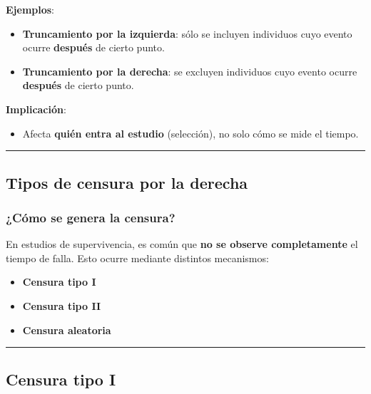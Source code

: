 \documentclass[
  letterpaper,
  DIV=11,
  numbers=noendperiod]{scrartcl}
\providecommand{\tightlist}{%
  \setlength{\itemsep}{0pt}\setlength{\parskip}{0pt}}
\begin{document}
\textbf{Ejemplos}:

\begin{itemize}
\tightlist
\item
  \textbf{Truncamiento por la izquierda}: sólo se incluyen individuos
  cuyo evento ocurre \textbf{después} de cierto punto.
\item
  \textbf{Truncamiento por la derecha}: se excluyen individuos cuyo
  evento ocurre \textbf{después} de cierto punto.
\end{itemize}

\textbf{Implicación}:

\begin{itemize}
\tightlist
\item
  Afecta \textbf{quién entra al estudio} (selección), no solo cómo se
  mide el tiempo.
\end{itemize}

\begin{center}\rule{0.5\linewidth}{0.5pt}\end{center}

\subsection{Tipos de censura por la
derecha}\label{tipos-de-censura-por-la-derecha}

\subsubsection{¿Cómo se genera la
censura?}\label{cuxf3mo-se-genera-la-censura}

En estudios de supervivencia, es común que \textbf{no se observe
completamente} el tiempo de falla. Esto ocurre mediante distintos
mecanismos:

\begin{itemize}
\tightlist
\item
  \textbf{Censura tipo I}
\item
  \textbf{Censura tipo II}
\item
  \textbf{Censura aleatoria}
\end{itemize}

\begin{center}\rule{0.5\linewidth}{0.5pt}\end{center}

\subsection{Censura tipo I}\label{censura-tipo-i}
\end{document}
